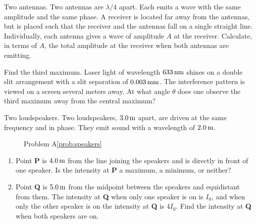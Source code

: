 \newpage

\begin{aproblem}{Two antennas.}
  Two antennas are $\lambda/4$ apart.  Each emits a wave with the same
  amplitude and the same phase.  A receiver is located far away from
  the antennas, but is placed such that the receiver and the antennas
  fall on a single straight line.  Individually, each antenna gives a
  wave of amplitude $A$ at the receiver.  Calculate, in terms of $A$,
  the total amplitude at the receiver when both antennas are emitting.
  \label{prob:TwoAntennas}
\end{aproblem}


\begin{aproblem}{Find the third maximum.}
  Laser light of wavelength $633\,\mbox{nm}$ shines on a double slit
  arrangement with a slit separation of $0.003\,\mbox{mm}$.  The
  interference pattern is viewed on a screen several meters away.  At
  what angle $\theta$ does one observe the third maximum away from the
  central maximum?
\end{aproblem}

\begin{aproblem}{Two loudspeakers.}
  Two loudspeakers, $3.0\,\mbox{m}$ apart, are driven at the same
  frequency and in phase.  They emit sound with a wavelength of
  $2.0\,\mbox{m}$.
  \label{prob:speakers}
  \begin{figure}[h]
    \begin{center}
      \caption{Problem A\ref{prob:speakers}}
    \end{center}
  \end{figure}
  \begin{enumerate}
  \item Point {\bf P} is $4.0\,\mbox{m}$ from the line joining the
    speakers and is directly in front of one speaker.  Is the
    intensity at {\bf P} a maximum, a minimum, or neither?
  \item Point {\bf Q} is $5.0\,\mbox{m}$ from the midpoint between the
    speakers and equidistant from them.  The intensity at {\bf Q} when
    only one speaker is on is $I_0$, and when only the other speaker
    is on the intensity at {\bf Q} is $4I_0$.  Find the intensity at
    {\bf Q} when both speakers are on.
  \end{enumerate}
\end{aproblem}


